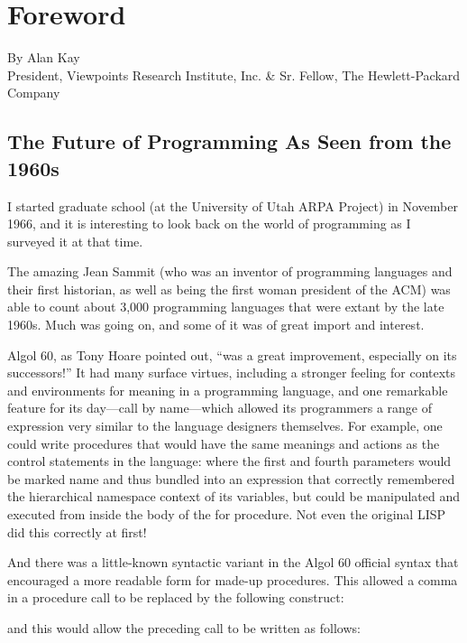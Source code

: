 \documentclass[a4paper,10pt,twoside]{book}
\begin{document}
    \sloppy
\fi
\chapter*{Foreword}

By Alan Kay \\
President, Viewpoints Research Institute, Inc. \& Sr. Fellow, 
The Hewlett-Packard Company 



\section*{The Future of Programming As Seen from the 1960s}
I started graduate school (at the University of Utah ARPA Project) in November 1966, and it is interesting to look back on the world of programming as I surveyed it at that time. 

The amazing Jean Sammit (who was an inventor of programming languages and their first historian, as well as being the first woman president of the ACM) was able to count about 3,000 programming languages that were extant by the late 1960s. Much was going on, and some of it was of great import and interest. 

Algol 60, as Tony Hoare pointed out, “was a great improvement, especially on its successors!” It had many surface virtues, including a stronger feeling for contexts and environments for meaning in a programming language, and one remarkable feature for its day—call by name—which allowed its programmers a range of expression very similar to the language designers themselves. For example, one could write procedures that would have the same meanings and actions as the control statements in the language:  where the first and fourth parameters would be marked name and thus bundled into an expression that correctly remembered the hierarchical namespace context of its variables, but could be manipulated and executed from inside the body of the for procedure. Not even the original 
LISP did this correctly at first! 

And there was a little-known syntactic variant in the Algol 60 official syntax that encouraged a more readable form for made-up procedures. This allowed a comma in a procedure call to be replaced by the following construct: 

and this would allow the preceding call to be written as follows: 
\end{document}
